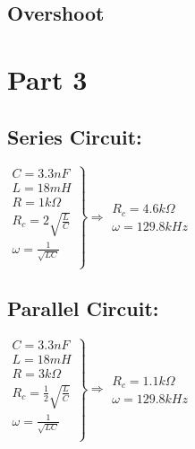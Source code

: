 \documentclass[a4paper,twoside]{report}
\begin{document}
        \subsection*{Overshoot}

    \section*{Part 3}
    {
        \begin{multicols}{2}\setlength{\columnseprule}{0pt}
            \subsection*{Series Circuit:}
                $
                    \left.
                    \begin{array}{l}
                        C = 3.3nF \\
                        L = 18mH \\
                        R = 1k\Omega \\
                        R_c = 2 \sqrt{\frac{L}{C}} \\
                        \omega = \frac{1}{\sqrt{LC}} \\
                    \end{array}
                    \right\}
                    \Longrightarrow
                    \left.
                        \begin{array}{l}
                            R_c = 4.6k\Omega \\
                            \omega = 129.8 kHz
                        \end{array}
                    \right.
                $
            \vfill\null
            \columnbreak
            \subsection*{Parallel Circuit:}
                $
                    \left.
                    \begin{array}{l}
                        C = 3.3nF \\
                        L = 18mH \\
                        R = 3k\Omega \\
                        R_c = \frac{1}{2} \sqrt{\frac{L}{C}} \\
                        \omega = \frac{1}{\sqrt{LC}} \\
                    \end{array}
                    \right\}
                    \Longrightarrow
                    \left.
                        \begin{array}{l}
                            R_c = 1.1k\Omega \\
                            \omega = 129.8 kHz
                        \end{array}
                    \right.
                $
        \end{multicols}
    }
\end{document}
